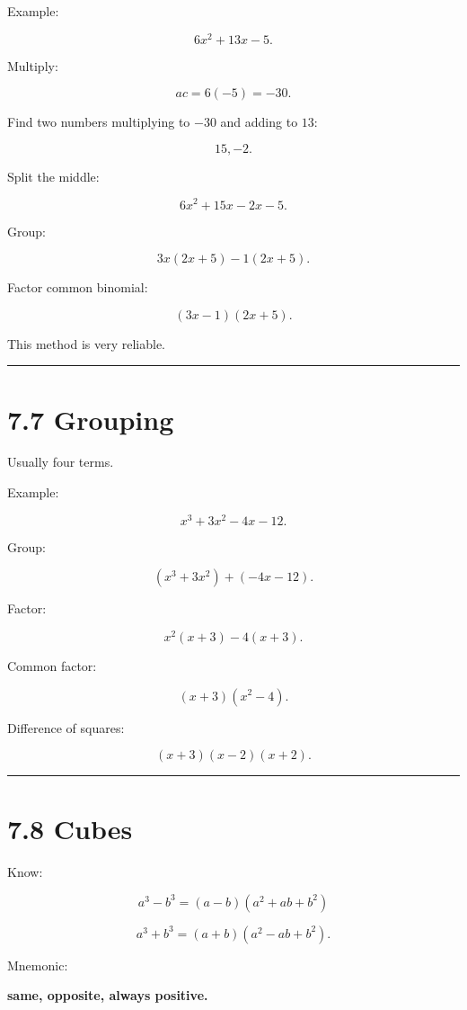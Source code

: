 \documentclass[
]{article}
\begin{document}
Example:

\[
6x^2+13x-5.
\]

Multiply:

\[
ac=6(-5)=-30.
\]

Find two numbers multiplying to \(-30\) and adding to \(13\):

\[
15,-2.
\]

Split the middle:

\[
6x^2+15x-2x-5.
\]

Group:

\[
3x(2x+5)-1(2x+5).
\]

Factor common binomial:

\[
\boxed{(3x-1)(2x+5)}.
\]

This method is very reliable.

\begin{center}\rule{0.5\linewidth}{0.5pt}\end{center}

\section{7.7 Grouping}\label{grouping}

Usually four terms.

Example:

\[
x^3+3x^2-4x-12.
\]

Group:

\[
(x^3+3x^2)+(-4x-12).
\]

Factor:

\[
x^2(x+3)-4(x+3).
\]

Common factor:

\[
(x+3)(x^2-4).
\]

Difference of squares:

\[
\boxed{(x+3)(x-2)(x+2)}.
\]

\begin{center}\rule{0.5\linewidth}{0.5pt}\end{center}

\section{7.8 Cubes}\label{cubes}

Know:

\[
\boxed{a^3-b^3=(a-b)(a^2+ab+b^2)}
\]

\[
\boxed{a^3+b^3=(a+b)(a^2-ab+b^2)}.
\]

Mnemonic:

\textbf{same, opposite, always positive.}
\end{document}
